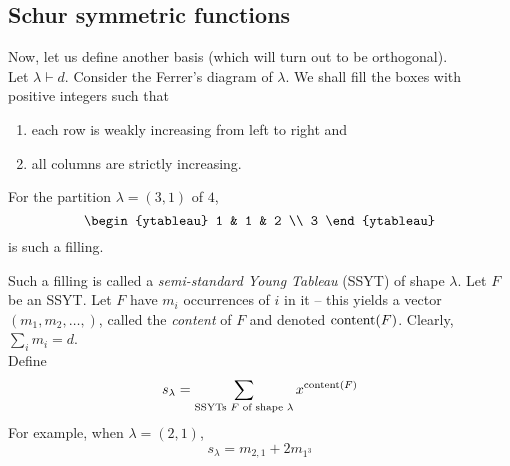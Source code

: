 \subsection{Schur symmetric functions}

	Now, let us define another basis (which will turn out to be orthogonal).\\

	Let $\lambda \vdash d$. Consider the Ferrer's diagram of $\lambda$. We shall fill the boxes with positive integers such that
	\begin{enumerate}
		\item each row is weakly increasing from left to right and
		\item all columns are strictly increasing.
	\end{enumerate}

	\begin{fex}
		For the partition $\lambda = (3,1)$ of $4$,
		\[
		\begin{ytableau}
			1 & 1 & 2 \\
			3
		\end{ytableau}
		\]
		is such a filling.
	\end{fex}
	Such a filling is called a \emph{semi-standard Young Tableau} (SSYT) of shape $\lambda$. Let $F$ be an SSYT. Let $F$ have $m_i$ occurrences of $i$ in it -- this yields a vector $(m_1,m_2,\ldots,)$, called the \emph{content} of $F$ and denoted $\operatorname{content}(F)$. Clearly, $\sum_i m_i = d$.\\
	Define
	\[ s_\lambda = \sum_{\text{SSYTs $F$ of shape $\lambda$}} x^{\operatorname{content}(F)} \]
	For example, when $\lambda = (2,1)$,
	\[ s_\lambda = m_{2,1} + 2 m_{1^3} \]

